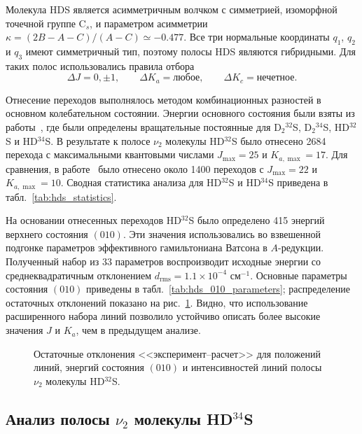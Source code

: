 Молекула HDS является асимметричным волчком с симметрией, изоморфной точечной группе C$_s$, и
параметром асимметрии $\kappa=(2B-A-C)/(A-C)\simeq -0.477$. Все три нормальные координаты $q_1$,
$q_2$ и $q_3$ имеют симметричный тип, поэтому полосы HDS являются гибридными. Для таких полос
использовались правила отбора
\begin{equation}
\Delta J=0,\pm1,\qquad \Delta K_a=\text{любое},\qquad \Delta K_c=\text{нечетное}.
\label{eq:hds_selection_rules}
\end{equation}

Отнесение переходов выполнялось методом комбинационных разностей в основном колебательном состоянии.
Энергии основного состояния были взяты из работы~\cite{d2s_camy1985}, где были определены
вращательные постоянные для D$_2{}^{32}$S, D$_2{}^{34}$S, HD$^{32}$S и HD$^{34}$S. В результате к полосе
$\nu_2$ молекулы HD$^{32}$S было отнесено 2684 перехода с максимальными квантовыми числами
$J_{\max}=25$ и $K_{a,\max}=17$. Для сравнения, в работе~\cite{hds_ulenikov1995} было отнесено около
1400 переходов с $J_{\max}=22$ и $K_{a,\max}=10$. Сводная статистика анализа для HD$^{32}$S и
HD$^{34}$S приведена в табл.~\ref{tab:hds_statistics}.



На основании отнесенных переходов HD$^{32}$S было определено 415 энергий верхнего состояния $(010)$.
Эти значения использовались во взвешенной подгонке параметров эффективного гамильтониана Ватсона в
$A$-редукции. Полученный набор из 33 параметров воспроизводит исходные энергии со
среднеквадратичным отклонением $d_{\textrm{rms}}=1.1\times10^{-4}$ см$^{-1}$. Основные параметры
состояния $(010)$ приведены в табл.~\ref{tab:hds_010_parameters}; распределение остаточных отклонений
показано на рис.~\ref{fig:hds32_residuals}. Видно, что использование расширенного набора линий позволило
устойчиво описать более высокие значения $J$ и $K_a$, чем в предыдущем анализе.



\begin{figure}[htbp]
    \centering
    \caption{Остаточные отклонения <<эксперимент--расчет>> для положений линий, энергий состояния
    $(010)$ и интенсивностей линий полосы $\nu_2$ молекулы HD$^{32}$S.}
    \label{fig:hds32_residuals}
\end{figure}

\subsection{Анализ полосы $\nu_2$ молекулы HD$^{34}$S}

